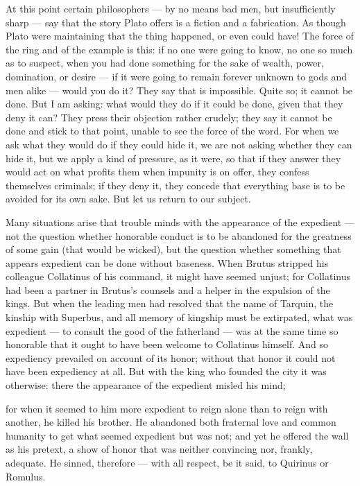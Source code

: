  At this point certain philosophers — by no means bad men, but insufficiently sharp — say that the story Plato offers is a fiction and a fabrication. As though Plato were maintaining that the thing happened, or even could have! The force of the ring and of the example is this: if no one were going to know, no one so much as to suspect, when you had done something for the sake of wealth, power, domination, or desire — if it were going to remain forever unknown to gods and men alike — would you do it? They say that is impossible. Quite so; it cannot be done. But I am asking: what would they do if it could be done, given that they deny it can? They press their objection rather crudely; they say it cannot be done and stick to that point, unable to see the force of the word. For when we ask what they would do if they could hide it, we are not asking whether they can hide it, but we apply a kind of pressure, as it were, so that if they answer they would act on what profits them when impunity is on offer, they confess themselves criminals; if they deny it, they concede that everything base is to be avoided for its own sake. But let us return to our subject.

 Many situations arise that trouble minds with the appearance of the expedient — not the question whether honorable conduct is to be abandoned for the greatness of some gain (that would be wicked), but the question whether something that appears expedient can be done without baseness. When Brutus stripped his colleague Collatinus of his command, it might have seemed unjust; for Collatinus had been a partner in Brutus's counsels and a helper in the expulsion of the kings. But when the leading men had resolved that the name of Tarquin, the kinship with Superbus, and all memory of kingship must be extirpated, what was expedient — to consult the good of the fatherland — was at the same time so honorable that it ought to have been welcome to Collatinus himself. And so expediency prevailed on account of its honor; without that honor it could not have been expediency at all. But with the king who founded the city it was otherwise: there the appearance of the expedient misled his mind;

 for when it seemed to him more expedient to reign alone than to reign with another, he killed his brother. He abandoned both fraternal love and common humanity to get what seemed expedient but was not; and yet he offered the wall as his pretext, a show of honor that was neither convincing nor, frankly, adequate. He sinned, therefore — with all respect, be it said, to Quirinus or Romulus.

